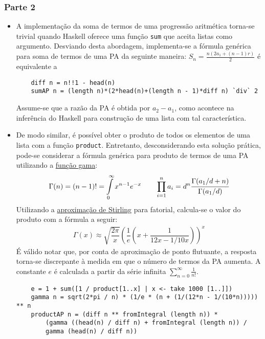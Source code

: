 \documentclass{../sftex/sftex}
\begin{document}
\subsubsection*{Parte 2}
\begin{itemize}
    \item A implementação da soma de termos de uma progressão aritmética
    torna-se trivial quando Haskell oferece uma função \verb!sum! que aceita
    listas como argumento. Desviando desta abordagem, implementa-se a fórmula
    genérica para soma de termos de uma PA da seguinte maneira:
    $S_n = \frac{n(2a_1 + (n - 1)r)}{2}$ é equivalente a
    \begin{verbatim}
    diff n = n!!1 - head(n)
    sumAP n = (length n)*(2*head(n)+(length n - 1)*diff n) `div` 2\end{verbatim}
    Assume-se que a razão da PA é obtida por $a_2 - a_1$, como acontece na
    inferência do Haskell para construção de uma lista com tal característica.

    \item De modo similar, é possível obter o produto de todos os elementos de
    uma lista com a função \verb!product!. Entretanto, desconsiderando esta
    solução prática, pode-se considerar a fórmula genérica para produto de
    termos de uma PA utilizando a
    \href{http://mathworld.wolfram.com/GammaFunction.html}{função gama}:
    \begin{gather*}
    \Gamma(n) = (n-1)! = \int\limits_0^\infty x^{n-1}e^{-x} \qquad
    \prod\limits_{i=1}^n a_{i} = d^n \cfrac{\Gamma(a_1/d + n)}{\Gamma(a_1/d)}
    \end{gather*}
    Utilizando a \href{https://en.wikipedia.org/wiki/Stirling's_approximation}
    {aproximação de Stirling} para fatorial, calcula-se o valor do produto com
    a fórmula a seguir:
    \begin{gather*}
        \Gamma(x) \approx \sqrt{\dfrac{2\pi}{x}}{\left(\dfrac{1}{e}\left(x +
        \dfrac{1}{12x - 1/10x}\right)\right)}^x
    \end{gather*}
    É válido notar que, por conta de aproximação de ponto flutuante, a resposta
    torna-se discrepante à medida em que o número de termos da PA aumenta. A
    constante $e$ é calculada a partir da série infinita
    $\sum\limits_{n=0}^{\infty} \frac{1}{n!}$.
    \begin{verbatim}
    e = 1 + sum([1 / product[1..x] | x <- take 1000 [1..]])
    gamma n = sqrt(2*pi / n) * (1/e * (n + (1/(12*n - 1/(10*n))))) ** n
    productAP n = (diff n ** fromIntegral (length n)) *
        (gamma ((head(n) / diff n) + fromIntegral (length n)) /
        gamma (head(n) / diff n))
     \end{verbatim}
\end{itemize}
\end{document}
